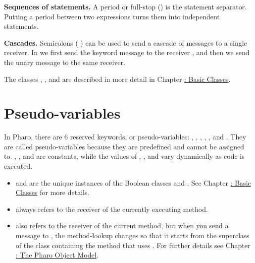 \documentclass[10pt,twoside,english]{_support/latex/sbabook/sbabook}
\begin{document}
\textbf{Sequences of statements.} A period or full-stop () is the statement
separator. Putting a period between two expressions turns them into independent
statements.

\textbf{Cascades.} Semicolons ( \textcode{;} ) can be used to send a cascade of messages to
a single receiver. In  we first send the keyword
message  to the receiver , and then we send the
unary message  to the same receiver.

The classes , ,  and  are described
in more detail in Chapter
\hyperref[cha:basicClasses]{: Basic Classes}.
\section{Pseudo-variables}
In Pharo, there are 6 reserved keywords, or pseudo-variables: , ,
, , , and . They are called
pseudo-variables because they are predefined and cannot be assigned to.
, , and  are constants, while the values of ,
, and  vary dynamically as code is executed.

\begin{itemize}
\item {} and  are the unique instances of the Boolean classes  and . See Chapter \hyperref[cha:basicClasses]{: Basic Classes} for more details.
\end{itemize}

\begin{itemize}
\item {} always refers to the receiver of the currently executing method.
\end{itemize}

\begin{itemize}
\item {} also refers to the receiver of the current method, but when you send a message to , the method-lookup changes so that it starts from the superclass of the class containing the method that uses . For further details see Chapter \hyperref[cha:model]{: The Pharo Object Model}.
\end{itemize}
\end{document}
